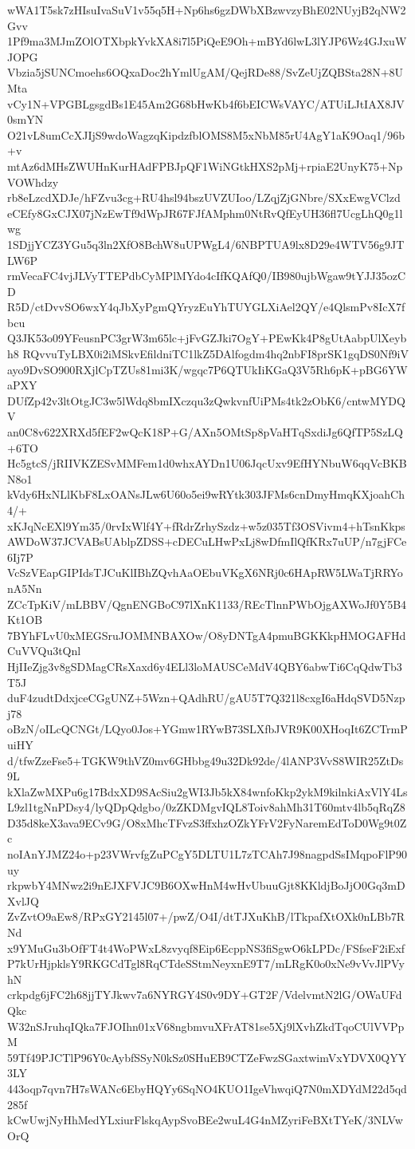wWA1T5sk7zHIsuIvaSuV1v55q5H+Np6hs6gzDWbXBzwvzyBhE02NUyjB2qNW2Gvv
1Pf9ma3MJmZOlOTXbpkYvkXA8i7l5PiQeE9Oh+mBYd6lwL3lYJP6Wz4GJxuWJOPG
Vbzia5jSUNCmoehs6OQxaDoc2hYmlUgAM/QejRDe88/SvZeUjZQBSta28N+8UMta
vCy1N+VPGBLgsgdBs1E45Am2G68bHwKb4f6bEICWsVAYC/ATUiLJtIAX8JV0smYN
O21vL8umCcXJIjS9wdoWagzqKipdzfblOMS8M5xNbM85rU4AgY1aK9Oaq1/96b+v
mtAz6dMHsZWUHnKurHAdFPBJpQF1WiNGtkHXS2pMj+rpiaE2UnyK75+NpVOWhdzy
rb8eLzcdXDJe/hFZvu3cg+RU4hsl94bszUVZUIoo/LZqjZjGNbre/SXxEwgVClzd
eCEfy8GxCJX07jNzEwTf9dWpJR67FJfAMphm0NtRvQfEyUH36fl7UcgLhQ0g1lwg
1SDjjYCZ3YGu5q3ln2XfO8BchW8uUPWgL4/6NBPTUA9lx8D29e4WTV56g9JTLW6P
rmVecaFC4vjJLVyTTEPdbCyMPlMYdo4cIfKQAfQ0/IB980ujbWgaw9tYJJ35ozCD
R5D/ctDvvSO6wxY4qJbXyPgmQYryzEuYhTUYGLXiAel2QY/e4QlsmPv8IcX7fbcu
Q3JK53o09YFeusnPC3grW3m65lc+jFvGZJki7OgY+PEwKk4P8gUtAabpUlXeybh8
RQvvuTyLBX0i2iMSkvEfildniTC1lkZ5DAlfogdm4hq2nbFI8prSK1gqDS0Nf9iV
ayo9DvSO900RXjlCpTZUs81mi3K/wgqc7P6QTUkIiKGaQ3V5Rh6pK+pBG6YWaPXY
DUfZp42v3ltOtgJC3w5lWdq8bmIXczqu3zQwkvnfUiPMs4tk2zObK6/cntwMYDQV
an0C8v622XRXd5fEF2wQcK18P+G/AXn5OMtSp8pVaHTqSxdiJg6QfTP5SzLQ+6TO
Hc5gtcS/jRIIVKZESvMMFem1d0whxAYDn1U06JqcUxv9EfHYNbuW6qqVcBKBN8o1
kVdy6HxNLlKbF8LxOANsJLw6U60o5ei9wRYtk303JFMs6cnDmyHmqKXjoahCh4/+
xKJqNcEXl9Ym35/0rvIxWlf4Y+fRdrZrhySzdz+w5z035Tf3OSVivm4+hTsnKkps
AWDoW37JCVABsUAblpZDSS+cDECuLHwPxLj8wDfmIlQfKRx7uUP/n7gjFCe6Ij7P
VcSzVEapGIPIdsTJCuKlIBhZQvhAaOEbuVKgX6NRj0c6HApRW5LWaTjRRYonA5Nn
ZCcTpKiV/mLBBV/QgnENGBoC97lXnK1133/REcTlnnPWbOjgAXWoJf0Y5B4Kt1OB
7BYhFLvU0xMEGSruJOMMNBAXOw/O8yDNTgA4pmuBGKKkpHMOGAFHdCuVVQu3tQnl
HjIIeZjg3v8gSDMagCRsXaxd6y4ELl3loMAUSCeMdV4QBY6abwTi6CqQdwTb3T5J
duF4zudtDdxjceCGgUNZ+5Wzn+QAdhRU/gAU5T7Q321l8cxgI6aHdqSVD5Nzpj78
oBzN/oILcQCNGt/LQyo0Jos+YGmw1RYwB73SLXfbJVR9K00XHoqIt6ZCTrmPuiHY
d/tfwZzeFse5+TGKW9thVZ0mv6GHbbg49u32Dk92de/4lANP3VvS8WIR25ZtDs9L
kXlaZwMXPu6g17BdxXD9SAcSiu2gWI3Jb5kX84wnfoKkp2ykM9kilnkiAxVlY4Ls
L9zl1tgNnPDsy4/lyQDpQdgbo/0zZKDMgvIQL8Toiv8ahMh31T60mtv4lb5qRqZ8
D35d8keX3ava9ECv9G/O8xMhcTFvzS3ffxhzOZkYFrV2FyNaremEdToD0Wg9t0Zc
noIAnYJMZ24o+p23VWrvfgZuPCgY5DLTU1L7zTCAh7J98nagpdSsIMqpoFlP90uy
rkpwbY4MNwz2i9nEJXFVJC9B6OXwHnM4wHvUbuuGjt8KKldjBoJjO0Gq3mDXvlJQ
ZvZvtO9aEw8/RPxGY2145l07+/pwZ/O4I/dtTJXuKhB/lTkpafXtOXk0nLBb7RNd
x9YMuGu3bOfFT4t4WoPWxL8zvyqf8Eip6EcppNS3fiSgwO6kLPDc/FSfseF2iExf
P7kUrHjpklsY9RKGCdTgl8RqCTdeSStmNeyxnE9T7/mLRgK0o0xNe9vVvJlPVyhN
crkpdg6jFC2h68jjTYJkwv7a6NYRGY4S0v9DY+GT2F/VdelvmtN2lG/OWaUFdQkc
W32nSJruhqIQka7FJOIhn01xV68ngbmvuXFrAT81se5Xj9lXvhZkdTqoCUlVVPpM
59Tf49PJCTlP96Y0cAybfSSyN0kSz0SHuEB9CTZeFwzSGaxtwimVxYDVX0QYY3LY
443oqp7qvn7H7sWANc6EbyHQYy6SqNO4KUO1IgeVhwqiQ7N0mXDYdM22d5qd285f
kCwUwjNyHhMedYLxiurFlskqAypSvoBEe2wuL4G4nMZyriFeBXtTYeK/3NLVwOrQ
